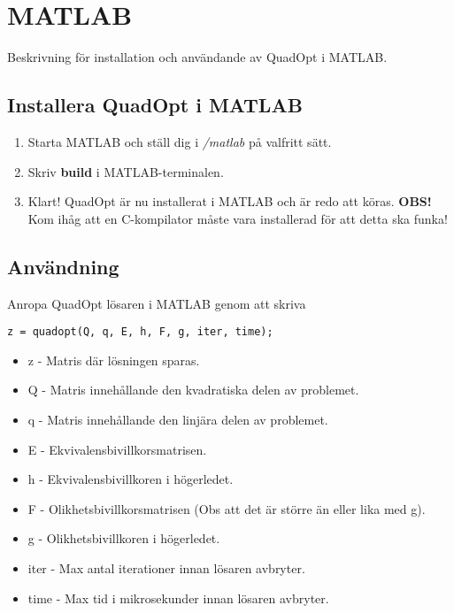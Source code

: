 \section{MATLAB}
Beskrivning för installation och användande av QuadOpt i MATLAB.

\subsection{Installera QuadOpt i MATLAB}
\begin{enumerate}
	\item Starta MATLAB och ställ dig i \emph{/matlab} på valfritt sätt. 
	\item Skriv \textbf{build} i MATLAB-terminalen.
	\item Klart! QuadOpt är nu installerat i MATLAB och är redo att köras.
	\newline
	\newline
	\textbf{OBS!} Kom ihåg att en C-kompilator måste vara installerad för att detta ska funka!
\end{enumerate}

\subsection{Användning}
Anropa QuadOpt lösaren i MATLAB genom att skriva

\begin{lstlisting}
z = quadopt(Q, q, E, h, F, g, iter, time);
\end{lstlisting}

\begin{itemize}
	\item z - Matris där lösningen sparas.
	\item Q - Matris innehållande den kvadratiska delen av problemet.
	\item q - Matris innehållande den linjära delen av problemet.
	\item E - Ekvivalensbivillkorsmatrisen.
	\item h - Ekvivalensbivillkoren i högerledet.
	\item F - Olikhetsbivillkorsmatrisen (Obs att det är större än eller lika med g).
	\item g - Olikhetsbivillkoren i högerledet.
	\item iter - Max antal iterationer innan lösaren avbryter.
	\item time - Max tid i mikrosekunder innan lösaren avbryter.
\end{itemize}

